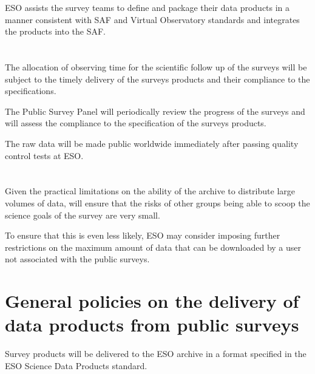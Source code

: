 \documentclass[a4paper,10pt]{book}
\begin{document}
ESO assists the survey teams to define and package their data products in a manner consistent with SAF and Virtual Observatory standards and integrates the products into the SAF.

\section{}
The allocation of observing time for the scientific follow up of the surveys will be subject to the timely delivery of the surveys products and their compliance to the specifications.

The Public Survey Panel will periodically review the progress of the surveys and will assess the compliance to the specification of the surveys products.

The raw data will be made public worldwide immediately after passing quality control tests at ESO.

\section{}
Given the practical limitations on the ability of the archive to distribute large volumes of data, will ensure that the risks of other groups being able to scoop the science goals of the survey are very small.

To ensure that this is even less likely, ESO may consider imposing further restrictions on the maximum amount of data that can be downloaded by a user not associated with the public surveys.

\section{General policies on the delivery of data products from public surveys}


Survey products will be delivered to the ESO archive in a format specified in the ESO Science Data Products standard.
\end{document}
